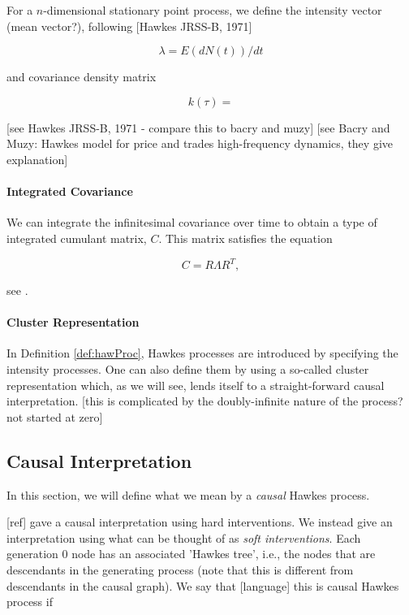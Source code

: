 \documentclass[accepted]{uai2021} %
\begin{document}
For a $n$-dimensional stationary point process, we define the intensity vector 
(mean vector?), following [Hawkes JRSS-B, 1971]

$$
\lambda = E(dN(t))/dt
$$

\noindent and covariance density matrix

$$
k(\tau) = 
$$

[see Hawkes JRSS-B, 1971 - compare this to bacry and muzy]
[see  Bacry and Muzy: Hawkes model for price and trades high-frequency 
dynamics, they give explanation]


\paragraph{Integrated Covariance}

We can integrate the infinitesimal covariance over time to obtain a type of 
integrated cumulant matrix, $C$. This matrix satisfies the equation

$$
C = R \Lambda R^T,
$$

see \cite{jovanovic2015}.


\paragraph{Cluster Representation}

In Definition \ref{def:hawProc}, Hawkes processes are introduced by specifying 
the intensity processes. One can also define them by using a so-called cluster 
representation which, as we will see, lends itself to a straight-forward causal 
interpretation. [this is complicated by the doubly-infinite nature of the 
process? not started at zero]





\subsection{Causal Interpretation}

In this section, we will define what we mean by a {\it causal} Hawkes process.

[ref] gave a causal interpretation using hard interventions. We instead give an 
interpretation using what can be thought of as \emph{soft interventions}. Each 
generation 0 node has an associated 'Hawkes tree', i.e., the nodes that are 
descendants in the generating process (note that this is different from 
descendants in the causal graph). We say that [language] this is causal Hawkes 
process if 
\end{document}
